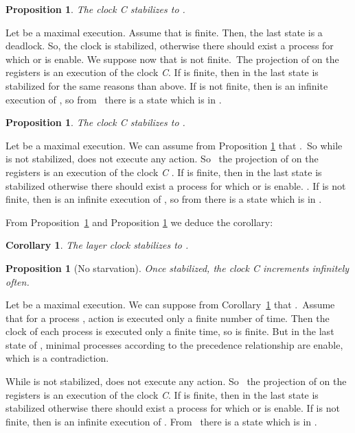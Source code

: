 \documentclass[11pt]{article}
\newenvironment{proof}{{\bf Proof. } }{{\hfill }\vspace{.5pc}}
\newtheorem{corollary}[theorem]{Corollary}
\newtheorem{proposition}[theorem]{Proposition}
\begin{document}
\begin{proposition}
\label{pro:dc_1 }
The clock \emph{C} stabilizes to .
\end{proposition}

\begin{proof}
Let  be a maximal execution. Assume that 
is finite. Then, the last state  is a deadlock.  So, the clock  is stabilized, otherwise there should exist a process for which  or  is enable. We suppose now that  is not finite.\ The
projection  of  on the registers  is an execution of the
clock \emph{C}. If  is finite, then in the last state  is stabilized for the same reasons than above. If  is not
finite, then  is an infinite execution of , so from~\cite{BPV04b} there is a state which is in .
\end{proof}

\begin{proposition}
\label{pro:dc_2 }
The clock \emph{C} stabilizes to  .
\end{proposition}

\begin{proof}
Let  be a maximal execution. We can
assume from Proposition \ref{pro:dc_1 } that .\ So while 
is not stabilized,  does not execute any action. So  \ the projection 
 of  on the registers  is an execution of the clock \emph{C}
. If  is finite, then in the last state  is
stabilized otherwise there should exist a process for which  or  is enable. . If  is not finite, then  is an infinite
execution of , so from \cite{BPV04b} there is a state which is in .


\end{proof}

From Proposition~\ref{pro:dc_1 } and Proposition \ref{pro:dc_2 } we deduce the corollary:

\begin{corollary}
\label{cor:WUstab-appendix}
The layer clock stabilizes to .
\end{corollary}

\begin{proposition}[No starvation]
Once stabilized, the clock \emph{C} increments infinitely often.
\end{proposition}

\begin{proof}
Let  be a maximal execution. We can
suppose from Corollary~\ref{cor:WUstab-appendix} that .\ Assume that for a
process , action  is  executed only a finite number of time. Then the clock of
each process is executed only a finite time, so  is finite. But in the
last state of , minimal processes according to the precedence
relationship are enable, which is a contradiction.

While  is not stabilized,  does not execute any action. So \
the projection  of  on the registers  is an execution of
the clock \emph{C}. If  is finite, then in the last state  is stabilized otherwise there should exist a process for which 
 or  is enable. If  is not finite, then  is
an infinite execution of .  From~\cite{BPV04b} there is a state
which is in .
\end{proof}
\end{document}
